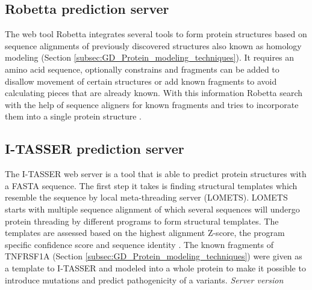 \subsection{Robetta prediction server}
The web tool Robetta integrates several tools to form protein structures based on sequence alignments of previously discovered structures also known as homology modeling (Section \ref{subsec:GD_Protein_modeling_techniques}).
It requires an amino acid sequence, optionally constrains and fragments can be added to disallow movement of certain structures or add known fragments to avoid calculating pieces that are already known. With this information Robetta search with the help of sequence aligners for known fragments and tries to incorporate them into a single protein structure \cite{song_high-resolution_2013,soding_protein_2005,kallberg_template-based_2012,yang_improving_2011,ovchinnikov_protein_2017}.
\label{subsec:MM_Robetta}

\subsection{I-TASSER prediction server}
The I-TASSER web server is a tool that is able to predict protein structures with a FASTA sequence. The first step it takes is finding structural templates which resemble the sequence by local meta-threading server (LOMETS). LOMETS starts with multiple sequence alignment of which several sequences will undergo protein threading by different programs to form structural templates. The templates are assessed based on the highest alignment Z-score, the program specific confidence score and sequence identity \cite{zhang_lab_lomets_nodate, wu_lomets:_2007}.
The known fragments of TNFRSF1A (Section \ref{subsec:GD_Protein_modeling_techniques}) were given as a template to I-TASSER and modeled into a whole protein to make it possible to introduce mutations and predict pathogenicity of a variants.
\label{subsec:MM_I_TASSER}
\newline
\textit{Server version}

